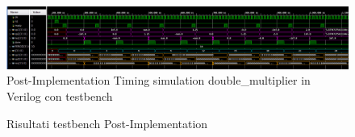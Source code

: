 \documentclass[]{IEEEtran}
\begin{document}
\begin{figure}[bt]
    \centering
    \includegraphics[width=\textwidth]{figures/sim_tb_tim}
    \caption{Post-Implementation Timing simulation double\_multiplier in Verilog con testbench}
    \label{fig:SIM_TB_TIM}
\end{figure}
\begin{figure}
    \centering
    \caption{Risultati testbench Post-Implementation}
    \label{fig:SIM_TB_TIM_RES}
\end{figure}


\end{document}
